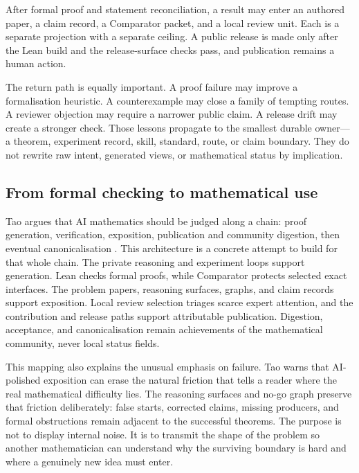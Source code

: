 \documentclass[10pt]{article}
\begin{document}
After formal proof and statement reconciliation, a result may enter an authored
paper, a claim record, a Comparator packet, and a local review unit. Each is a
separate projection with a separate ceiling. A public release is made only
after the Lean build and the release-surface checks pass, and publication
remains a human action.

The return path is equally important. A proof failure may improve a
formalisation heuristic. A counterexample may close a family of tempting
routes. A reviewer objection may require a narrower public claim. A release
drift may create a stronger check. Those lessons propagate to the smallest
durable owner---a theorem, experiment record, skill, standard, route, or claim
boundary. They do not rewrite raw intent, generated views, or mathematical
status by implication.

\subsection{From formal checking to mathematical use}

Tao argues that AI mathematics should be judged along a chain: proof
generation, verification, exposition, publication and community digestion,
then eventual canonicalisation \cite{taoai}. This architecture is a concrete
attempt to build for that whole chain. The private reasoning and experiment
loops support generation. Lean checks formal proofs, while Comparator protects
selected exact interfaces. The problem papers, reasoning surfaces, graphs, and
claim records support exposition. Local review selection triages scarce expert attention, and
the contribution and release paths support attributable publication. Digestion,
acceptance, and canonicalisation remain achievements of the mathematical
community, never local status fields.

This mapping also explains the unusual emphasis on failure. Tao warns that
AI-polished exposition can erase the natural friction that tells a reader
where the real mathematical difficulty lies. The reasoning surfaces and no-go
graph preserve that friction deliberately: false starts, corrected claims,
missing producers, and formal obstructions remain adjacent to the successful
theorems. The purpose is not to display internal noise. It is to transmit the
shape of the problem so another mathematician can understand why the surviving
boundary is hard and where a genuinely new idea must enter.
\end{document}
